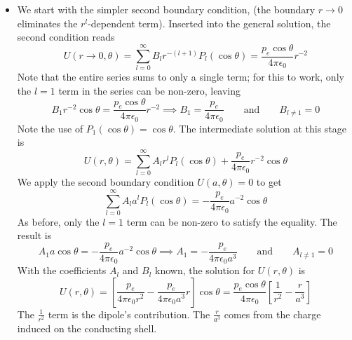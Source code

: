 \documentclass[11pt, a4paper]{article}
\newcommand{\eqtext}[1]{\qquad \text{#1} \qquad}
\newcommand{\ee}{\epsilon_{0}}  %
\begin{document}
\begin{itemize}
	\item We start with the simpler second boundary condition, (the boundary $ r \to 0 $ eliminates the $ r^{l} $-dependent term). Inserted into the general solution, the second condition reads
	\begin{equation*}
		U(r\to 0, \theta) = \sum_{l = 0}^{\infty} B_{l}r^{-(l+1)}P_{l}(\cos \theta) = \frac{p_{e}\cos \theta}{4\pi \ee }r^{-2}
	\end{equation*}
	Note that the entire series sums to only a single term; for this to work, only the $ l = 1 $ term in the series can be non-zero, leaving
	\begin{equation*}
		B_{1}r^{-2}\cos \theta = \frac{p_{e}\cos \theta}{4\pi \ee }r^{-2} \implies B_{1} = \frac{p_{e}}{4\pi \ee} \eqtext{and} B_{l\neq 1} = 0
	\end{equation*}
	Note the use of $ P_{1}(\cos \theta) = \cos \theta $. The intermediate solution at this stage is
	\begin{equation*}
		U(r, \theta) = \sum_{l = 0}^{\infty} A_{l} r^{l} P_{l}(\cos \theta) + \frac{p_{e}}{4\pi \ee}r^{-2} \cos \theta
	\end{equation*}
	We apply the second boundary condition $ U(a, \theta) = 0 $ to get
	\begin{equation*}
		\sum_{l = 0}^{\infty} A_{l} a^{l} P_{l}(\cos \theta) = - \frac{p_{e}}{4\pi \ee}a^{-2} \cos \theta
	\end{equation*}
	As before, only the $ l = 1 $ term can be non-zero to satisfy the equality. The result is
	\begin{equation*}
		A_{1}a\cos \theta = - \frac{p_{e}}{4\pi \ee}a^{-2} \cos \theta \implies A_{1} = -\frac{p_{e}}{4\pi \ee a^{3}} \eqtext{and} A_{l\neq 1} = 0
	\end{equation*}
	With the coefficients $ A_{l} $ and $ B_{l} $ known, the solution for $ U(r, \theta) $ is
	\begin{equation*}
		U(r, \theta) = \left[\frac{p_{e}}{4\pi \ee r^{2}} -\frac{p_{e}}{4\pi \ee a^{3}}r\right]\cos \theta = \frac{p_{e}\cos \theta}{4\pi \ee}\left[\frac{1}{r^{2}} - \frac{r}{a^{3}}\right]
	\end{equation*}
	The $ \frac{1}{r^{2}} $ term is the dipole's contribution. The $ \frac{r}{a^{3}} $ comes from the charge induced on the conducting shell. 
	

\end{itemize}
\end{document}
